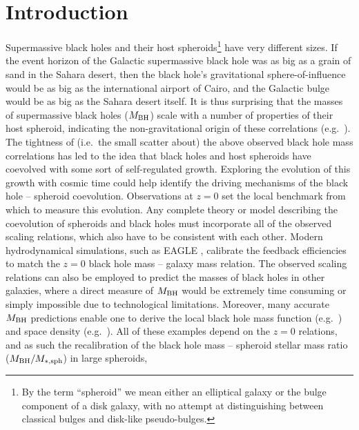 \documentclass[preprint2]{emulateapj}
\begin{document}
\section{Introduction}
\label{sec:int}
Supermassive black holes and their host spheroids\footnote{By the term ``spheroid'' 
we mean either an elliptical galaxy or the bulge component of a disk galaxy, 
with no attempt at distinguishing between classical bulges and disk-like pseudo-bulges. } 
have very different sizes. 
If the event horizon of the Galactic supermassive black hole was as big as a grain of sand in the Sahara desert, 
then the black hole's gravitational sphere-of-influence would be as big as the international airport of Cairo, 
and the Galactic bulge would be as big as the Sahara desert itself.
It is thus surprising that the masses of supermassive black holes ($M_{\rm BH}$) 
scale with a number of properties of their host spheroid, 
indicating the non-gravitational origin of these correlations 
(e.g.~\citealt{dressler1989,yee1992,kormendyrichstone1995,laor1997,magorrian1998,ferraresemerritt2000,gebhardt2000,graham2001,
marconihunt2003,haringrix2004,grahamscott2015}). \\
The tightness of (i.e.~the small scatter about) the above observed black hole mass correlations has led to the idea
that black holes and host spheroids have coevolved with some sort of self-regulated growth.
Exploring the evolution of this growth with cosmic time could help identify
the driving mechanisms of the black hole -- spheroid coevolution.
Observations at $z=0$ set the local benchmark from which to measure this evolution.
Any complete theory or model describing the coevolution of spheroids and black holes must incorporate 
all of the observed scaling relations, which also have to be consistent with each other.
Modern hydrodynamical simulations, such as EAGLE \citep{schaye2015}, calibrate the feedback efficiencies 
to match the $z=0$ black hole mass -- galaxy mass relation.
The observed scaling relations can also be employed to predict the masses of black holes in other galaxies, where a direct
measure of $M_{\rm BH}$ would be extremely time consuming or simply impossible due to technological limitations.
Moreover, many accurate $M_{\rm BH}$ predictions enable one to derive 
the local black hole mass function (e.g.~\citealt{salucci1999,graham2007smbhmassfunction,shankar2009,shankar2013,fontanot2015}) 
and space density (e.g.~\citealt{grahamdriver2007smbhmassdensity,comastri2015}). 
All of these examples depend on the $z=0$ relations, 
and as such the recalibration of the black hole mass -- spheroid stellar mass ratio ($M_{\rm BH}/M_{\rm *,sph}$) in large spheroids,
\end{document}
